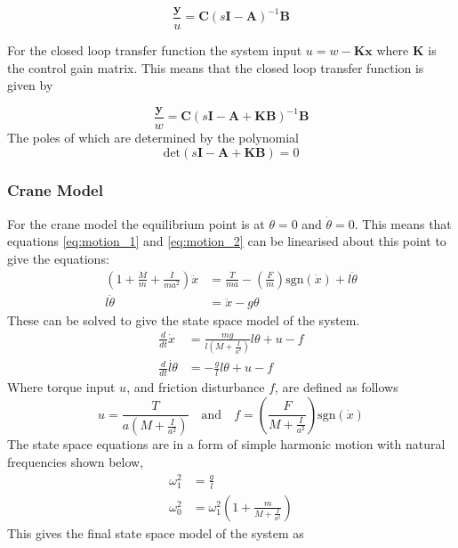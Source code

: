 \documentclass{article}
\begin{document}
\begin{equation} 
  \frac{\mathbf{y}}{u} = \mathbf{C} (s\mathbf{I} - \mathbf{A}) ^{-1} \mathbf{B}
\end{equation}

For the closed loop transfer function the system input $u = w - \mathbf{Kx}$ where $\mathbf{K}$ is the control gain matrix.
This means that the closed loop transfer function is given by

\begin{equation}
  \frac{\mathbf{y}}{w} = \mathbf{C} (s\mathbf{I} - \mathbf{A} + \mathbf{KB}) ^{-1} \mathbf{B}
\end{equation}
The poles of which are determined by the polynomial
\begin{equation}
  \text{det} \left( s\mathbf{I} - \mathbf{A} + \mathbf{KB} \right) = 0
\end{equation}

\subsubsection{Crane Model}

For the crane model the equilibrium point is at $\theta = 0$ and $\dot{\theta} = 0$.
This means that equations \ref{eq:motion_1} and \ref{eq:motion_2} can be linearised about this point to give the equations:
\begin{align}
  \left( 1 + \frac{M}{m} + \frac{I}{ma^2} \right) \ddot{x} &= \frac{T}{ma} - \left(\frac{F}{m}\right)\text{sgn}(\dot{x}) + l \ddot{\theta} \label{eq:crane_motion_1} \\
  l \ddot{\theta} &= \ddot{x} - g\theta \label{eq:crane_motion_2}
\end{align}
These can be solved to give the state space model of the system.
\begin{align}
  \frac{d}{dt} \dot{x} &= \frac{mg}{l\left(M+\frac{I}{a^2}\right)} l\theta + u - f \\
  \frac{d}{dt} \dot{l\theta} &= -\frac{g}{l}l\theta + u - f
\end{align}
Where torque input $u$, and friction disturbance $f$, are defined as follows
\begin{equation}
  u = \frac{T}{a\left(M+\frac{I}{a^2}\right)} \quad \text{and} \quad f = \left(\frac{F}{M + \frac{I}{a^2}} \right) \text{sgn} (\dot{x})
  \label{eq:ss_system_inputs}
\end{equation}
The state space equations are in a form of simple harmonic motion with natural frequencies shown below,
\begin{align}
  \omega_1^2 &= \frac{g}{l} \\
  \omega_0^2 &= \omega_1^2\left(1 + \frac{m}{M+\frac{I}{a^2}} \right)
\end{align}
This gives the final state space model of the system as
\end{document}
